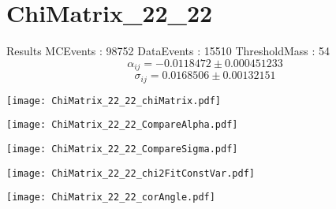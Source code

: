 \documentclass[a4paper,12pt]{article}
\begin{document}
\section{ChiMatrix\_22\_22}
\begin{minipage}{0.49\linewidth} Results \newline
MCEvents : 98752\newline
DataEvents : 15510 \newline
ThresholdMass : 54\\
$$\alpha_{ij} = -0.0118472\pm 0.000451233$$
$$\sigma_{ij} = 0.0168506\pm 0.00132151$$
\end{minipage}\hfill
\begin{minipage}{0.49\linewidth} 
\texttt{[image: ChiMatrix\_22\_22\_chiMatrix.pdf]}\\
\end{minipage}
\hfill
\begin{minipage}{0.49\linewidth} 
\texttt{[image: ChiMatrix\_22\_22\_CompareAlpha.pdf]}\\
\end{minipage}
\hfill
\begin{minipage}{0.49\linewidth} 
\texttt{[image: ChiMatrix\_22\_22\_CompareSigma.pdf]}\\
\end{minipage}
\begin{minipage}{0.49\linewidth} 
\texttt{[image: ChiMatrix\_22\_22\_chi2FitConstVar.pdf]}\\
\end{minipage}
\hfill
\begin{minipage}{0.49\linewidth} 
\texttt{[image: ChiMatrix\_22\_22\_corAngle.pdf]}\\
\end{minipage}
\end{document}
